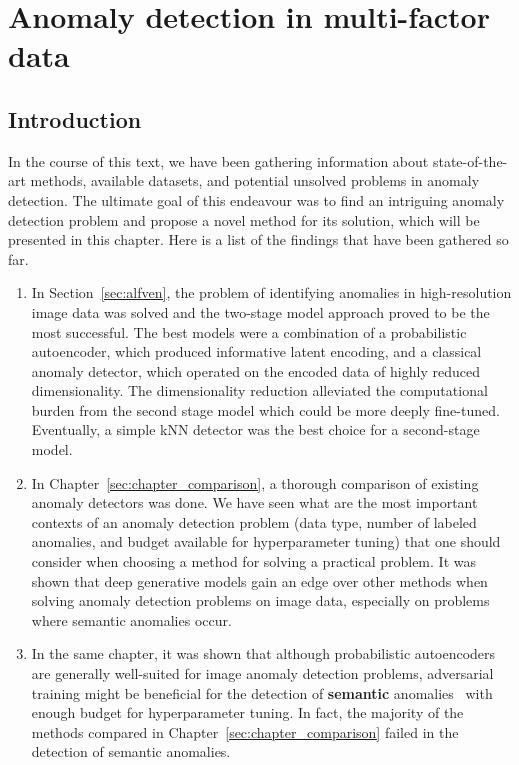 \chapter{Anomaly detection in multi-factor data} \label{sec:chapter_sgvaegan}

\section{Introduction}

In the course of this text, we have been gathering information about state-of-the-art methods, available datasets, and potential unsolved problems in anomaly detection. The ultimate goal of this endeavour was to find an intriguing anomaly detection problem and propose a novel method for its solution, which will be presented in this chapter. Here is a list of the findings that have been gathered so far.

\begin{enumerate}
    \item In Section~\ref{sec:alfven}, the problem of identifying anomalies in high-resolution image data was solved and the two-stage model approach proved to be the most successful. The best models were a combination of a probabilistic autoencoder, which produced informative latent encoding, and a classical anomaly detector, which operated on the encoded data of highly reduced dimensionality. The dimensionality reduction alleviated the computational burden from the second stage model which could be more deeply fine-tuned. Eventually, a simple kNN detector was the best choice for a second-stage model. 
    \item In Chapter~\ref{sec:chapter_comparison}, a thorough comparison of existing anomaly detectors was done. We have seen what are the most important contexts of an anomaly detection problem (data type, number of labeled anomalies, and budget available for hyperparameter tuning) that one should consider when choosing a method for solving a practical problem. It was shown that deep generative models gain an edge over other methods when solving anomaly detection problems on image data, especially on problems where semantic anomalies occur. 
    \item In the same chapter, it was shown that although probabilistic autoencoders are generally well-suited for image anomaly detection problems, adversarial training might be beneficial for the detection of \textbf{semantic} anomalies~\cite{ahmed2020detecting} with enough budget for hyperparameter tuning. In fact, the majority of the methods compared in Chapter~\ref{sec:chapter_comparison} failed in the detection of semantic anomalies.
\end{enumerate}


